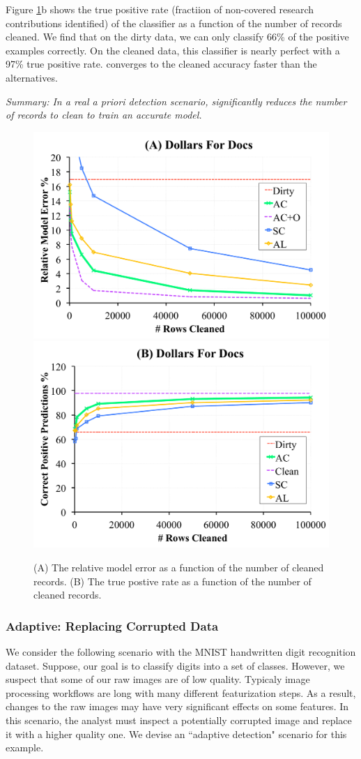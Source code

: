 Figure \ref{dfd}b shows the true positive rate (fractiion of non-covered research contributions identified) of the classifier as a function of the number of records cleaned. 
We find that on the dirty data, we can only classify 66\% of the positive examples correctly.
On the cleaned data, this classifier is nearly perfect with a 97\% true positive rate.
\sys converges to the cleaned accuracy faster than the alternatives.

\vspace{0.25em}

\noindent \emph{Summary: In a real a priori detection scenario, \sys significantly reduces the number of records to clean to train an accurate model. }

\begin{figure}[ht!]
\centering
 \includegraphics[width=0.49\columnwidth]{exp/exp13a.pdf}
 \includegraphics[width=0.49\columnwidth]{exp/exp13b.pdf}
 \caption{(A) The relative model error as a function of the number of cleaned records. (B) The true postive rate as a function of the number of cleaned records. \label{dfd}}
\end{figure}

\subsubsection{Adaptive: Replacing Corrupted Data}
We consider the following scenario with the MNIST handwritten digit recognition dataset.
Suppose, our goal is to classify digits into a set of classes.
However, we suspect that some of our raw images are of low quality.
Typicaly image processing workflows are long with many different featurization steps.
As a result, changes to the raw images may have very significant effects on some features.
In this scenario, the analyst must inspect a potentially corrupted image and replace it with a higher quality one.
We devise an ``adaptive detection" \sys scenario for this example.

